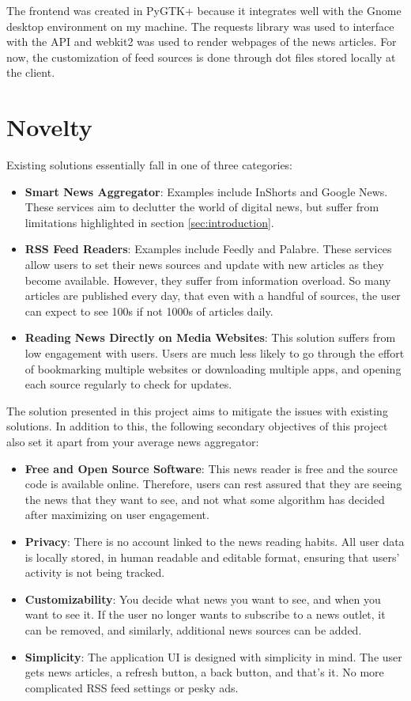 \documentclass[12pt]{article}
\begin{document}
The frontend was created in PyGTK+ because it integrates well with the Gnome desktop environment on my machine. The requests library was used to interface with the API and webkit2 was used to render webpages of the news articles. For now, the customization of feed sources is done through dot files stored locally at the client.

\section{Novelty}

Existing solutions essentially fall in one of three categories:
\begin{itemize}
  \item \textbf{Smart News Aggregator}: Examples include InShorts and Google News. These services aim to declutter the world of digital news, but suffer from limitations highlighted in section \ref{sec:introduction}.
  \item \textbf{RSS Feed Readers}: Examples include Feedly and Palabre. These services allow users to set their news sources and update with new articles as they become available. However, they suffer from information overload. So many articles are published every day, that even with a handful of sources, the user can expect to see 100s if not 1000s of articles daily.
  \item \textbf{Reading News Directly on Media Websites}: This solution suffers from low engagement with users. Users are much less likely to go through the effort of bookmarking multiple websites or downloading multiple apps, and opening each source regularly to check for updates.
\end{itemize}

The solution presented in this project aims to mitigate the issues with existing solutions. In addition to this, the following secondary objectives of this project also set it apart from your average news aggregator:
\begin{itemize}
  \item \textbf{Free and Open Source Software}: This news reader is free and the source code is available online. Therefore, users can rest assured that they are seeing the news that they want to see, and not what some algorithm has decided after maximizing on user engagement.
  \item \textbf{Privacy}: There is no account linked to the news reading habits. All user data is locally stored, in human readable and editable format, ensuring that users' activity is not being tracked.
  \item \textbf{Customizability}: You decide what news you want to see, and when you want to see it. If the user no longer wants to subscribe to a news outlet, it can be removed, and similarly, additional news sources can be added. 
  \item \textbf{Simplicity}: The application UI is designed with simplicity in mind. The user gets news articles, a refresh button, a back button, and that's it. No more complicated RSS feed settings or pesky ads.
\end{itemize}
\end{document}
